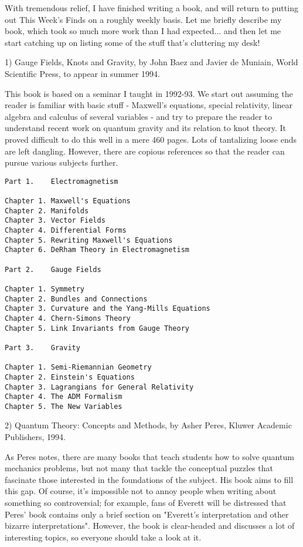 

With tremendous relief, I have finished writing a book, and will return
to putting out This Week's Finds on a roughly weekly basis.  Let me
briefly describe my book, which took so much more work than I had
expected...  and then let me start catching up on listing some of the
stuff that's cluttering my desk!

1)  Gauge Fields, Knots and Gravity, by John Baez and Javier de
Muniain, World Scientific Press, to appear in summer 1994.

This book is based on a seminar I taught in 1992-93.  We start out
assuming the reader is familiar with basic stuff - Maxwell's
equations, special relativity, linear algebra and calculus of several
variables - and try to prepare the reader to understand recent work on
quantum gravity and its relation to knot theory.  It proved difficult to
do this well in a mere 460 pages.  Lots of tantalizing loose ends are
left dangling.  However, there are copious references so that the reader
can pursue various subjects further.

\begin{verbatim}
Part 1.    Electromagnetism 

Chapter 1. Maxwell's Equations 
Chapter 2. Manifolds
Chapter 3. Vector Fields
Chapter 4. Differential Forms
Chapter 5. Rewriting Maxwell's Equations
Chapter 6. DeRham Theory in Electromagnetism

Part 2.    Gauge Fields

Chapter 1. Symmetry
Chapter 2. Bundles and Connections
Chapter 3. Curvature and the Yang-Mills Equations
Chapter 4. Chern-Simons Theory
Chapter 5. Link Invariants from Gauge Theory

Part 3.    Gravity

Chapter 1. Semi-Riemannian Geometry
Chapter 2. Einstein's Equations
Chapter 3. Lagrangians for General Relativity
Chapter 4. The ADM Formalism
Chapter 5. The New Variables
\end{verbatim}
    

2) Quantum Theory: Concepts and Methods, by Asher Peres, 
Kluwer Academic Publishers, 1994.

As Peres notes, there are many books that teach students how to solve
quantum mechanics problems, but not many that tackle the conceptual
puzzles that fascinate those interested in the foundations of the
subject.  His book aims to fill this gap.  Of course, it's impossible
not to annoy people when writing about something so controversial; for
example, fans of Everett will be distressed that Peres' book contains
only a brief section on "Everett's interpretation and other bizarre
interpretations".  However, the book is clear-headed and discusses a
lot of interesting topics, so everyone should take a look at it.  

